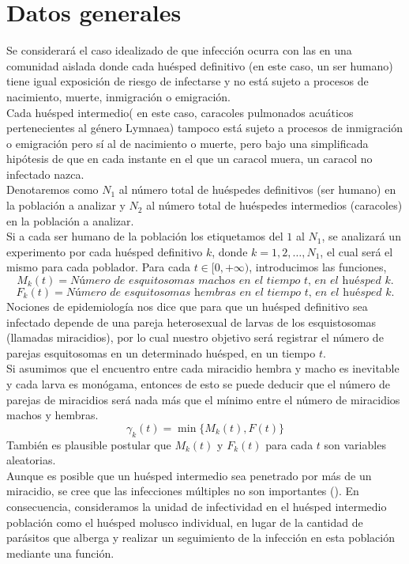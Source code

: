 \section{Datos generales}
Se considerará el caso idealizado de que infección ocurra con las en una comunidad aislada donde cada huésped definitivo (en este caso, un ser humano) tiene igual exposición de riesgo de infectarse y no está sujeto a procesos de nacimiento, muerte, inmigración o emigración.\\
Cada huésped intermedio( en este caso, caracoles pulmonados acuáticos pertenecientes al género Lymnaea) tampoco está sujeto a procesos de inmigración o emigración pero sí al de nacimiento o muerte, pero bajo una simplificada hipótesis de que en cada instante en el que un caracol muera, un caracol no infectado nazca.\\
Denotaremos como $N_1$ al número total de huéspedes definitivos (ser humano) en la población a analizar y $N_2$ al número total de huéspedes intermedios (caracoles) en la población a analizar.\\
Si a cada ser humano de la población los etiquetamos del $1$ al $N_1$, se analizará un experimento por cada huésped definitivo $k$, donde $k=1,2,\ldots,N_1$, el cual será el mismo para cada poblador.
Para cada $t\in[0,+\infty)$, introducimos las funciones,
$$M_k(t)= \textit{Número de esquitosomas machos en el tiempo t, en el huésped k.}$$
$$F_k(t)=\textit{Número de esquitosomas hembras en el tiempo t, en el huésped k.}$$
Nociones de epidemiología nos dice que para que un huésped definitivo sea infectado depende de una pareja heterosexual de larvas de los esquistosomas (llamadas miracidios), por lo cual nuestro objetivo será registrar el número de parejas esquitosomas en un determinado huésped, en un tiempo $t$.\\Si asumimos que el encuentro entre cada miracidio hembra y macho es inevitable y cada larva es monógama, entonces de esto se puede deducir que el número de parejas de miracidios será nada más que el mínimo entre el número de miracidios machos y hembras.
$$\gamma_k(t)=\min\{M_k(t),F(t)\}$$
También es plausible postular que $M_k(t)$ y $F_k(t)$ para cada $t$ son variables aleatorias.\\
Aunque es posible que un huésped intermedio sea penetrado por más de un miracidio, se cree que las infecciones múltiples no son importantes (\cite{Jordan y Webbe}). En consecuencia, consideramos la unidad de infectividad en el huésped intermedio población como el huésped molusco individual, en lugar de la cantidad de parásitos que alberga y realizar un seguimiento de la infección en esta población mediante una función.\\
